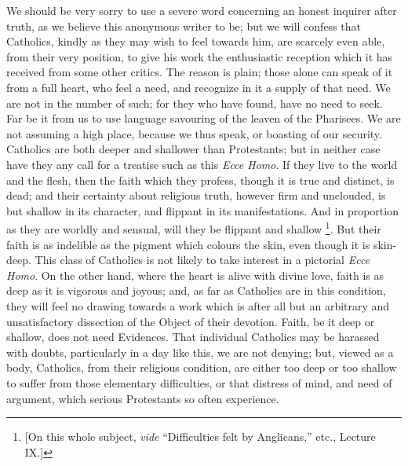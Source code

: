 We should be very sorry to use a severe word
concerning an honest inquirer after truth, as we believe this
anonymous writer to be; but we will confess that Catholics, kindly as
they may wish to feel towards him, are scarcely even able, from
their very position, to give his work the enthusiastic reception which
it has received from some other critics. The reason is plain; those
alone can speak of it from a full heart, who feel a need, and
recognize in it a supply of that need. We are not in the number of
such; for they who have found, have no need to seek. Far be it from us
to use language savouring of the leaven of the Pharisees. We are not
assuming a high place, because we thus speak, or boasting of our
security. Catholics are both deeper and shallower than Protestants;
but in neither case have they any call for a treatise such as this \emph{Ecce
Homo}. If they live to the world and the flesh, then the faith
which they profess, though it is true and distinct, is dead; and their
certainty about religious truth, however firm and unclouded, is but
shallow in its character, and flippant in its manifestations. And in
proportion as they are worldly and sensual, will they be flippant and
shallow \footnote{[On this whole subject, \emph{vide}
``Difficulties felt by Anglicans,'' etc., Lecture
IX.]}. But their faith
is as indelible as the pigment which colours the skin, even though it
is skin-deep. This class of Catholics is not likely to take interest
in a pictorial \emph{Ecce Homo}. On the other hand, where the heart is
alive with divine love, faith is as deep as it is vigorous and joyous;
and, as far as Catholics are in this condition, they will feel no
drawing towards a work which is after all but an arbitrary and
unsatisfactory dissection of the Object of their devotion. Faith, be
it deep or shallow, does not need Evidences. That individual Catholics
may be harassed with doubts, particularly in a day like this, we are
not denying; but, viewed as a body, Catholics, from their religious
condition, are either too deep or too shallow to suffer from those
elementary difficulties, or that distress of mind, and need of
argument, which serious Protestants so often experience.

